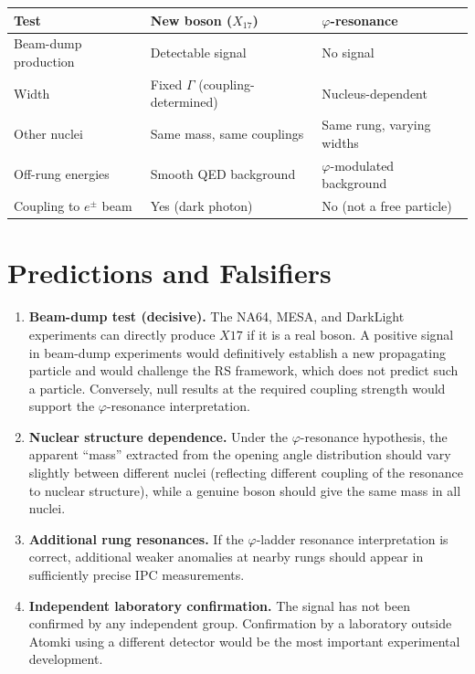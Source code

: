 \documentclass[12pt,a4paper]{article}
\theoremstyle{definition}
\theoremstyle{remark}
\begin{document}
\begin{center}
\renewcommand{\arraystretch}{1.3}
\begin{tabular}{p{3.8cm}p{3.8cm}p{3.8cm}}
\toprule
\textbf{Test} & \textbf{New boson ($X_{17}$)} & \textbf{$\varphi$-resonance}\\
\midrule
Beam-dump production & Detectable signal & No signal \\
Width & Fixed $\Gamma$ (coupling-determined) & Nucleus-dependent \\
Other nuclei & Same mass, same couplings & Same rung, varying widths \\
Off-rung energies & Smooth QED background & $\varphi$-modulated background \\
Coupling to $e^\pm$ beam & Yes (dark photon) & No (not a free particle) \\
\bottomrule
\end{tabular}
\end{center}

\section{Predictions and Falsifiers}
\label{sec:predict}

\begin{enumerate}
  \item \textbf{Beam-dump test (decisive).}  The NA64, MESA, and
  DarkLight experiments can directly produce $X17$ if it is a real
  boson.  A positive signal in beam-dump experiments would definitively
  establish a new propagating particle and would challenge the RS
  framework, which does not predict such a particle.  Conversely, null
  results at the required coupling strength would support the
  $\varphi$-resonance interpretation.

  \item \textbf{Nuclear structure dependence.}  Under the
  $\varphi$-resonance hypothesis, the apparent ``mass'' extracted from
  the opening angle distribution should vary slightly between different
  nuclei (reflecting different coupling of the resonance to nuclear
  structure), while a genuine boson should give the same mass in all
  nuclei.

  \item \textbf{Additional rung resonances.}  If the $\varphi$-ladder
  resonance interpretation is correct, additional weaker anomalies at
  nearby rungs should appear in sufficiently precise IPC measurements.

  \item \textbf{Independent laboratory confirmation.}  The signal has
  not been confirmed by any independent group.  Confirmation by a
  laboratory outside Atomki using a different detector would be the
  most important experimental development.
\end{enumerate}
\end{document}
